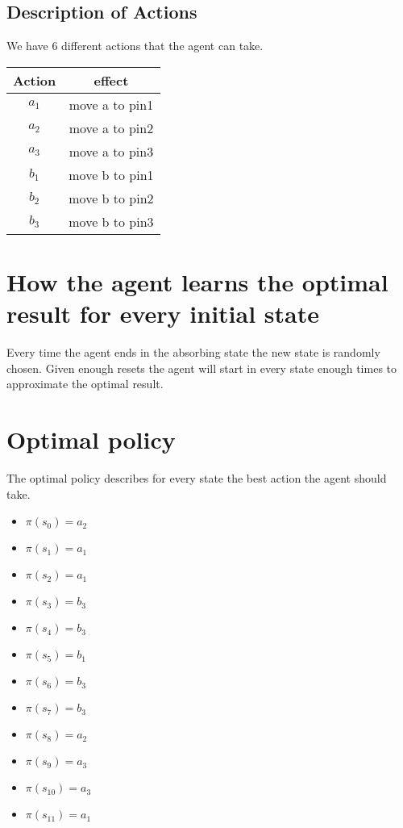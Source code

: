\documentclass[a4paper]{article}
\begin{document}
\newpage
\subsection{Description of Actions}
We have 6 different actions that the agent can take. \\

\begin{tabular}{c|c}
Action & effect \\
\hline
$a_{1}$ & move a to pin1 \\
$a_{2}$ & move a to pin2 \\
$a_{3}$ & move a to pin3 \\
$b_{1}$ & move b to pin1 \\
$b_{2}$ & move b to pin2 \\
$b_{3}$ & move b to pin3
\end{tabular}

\section{How the agent learns the optimal result for every initial state}
Every time the agent ends in the absorbing state the new state is randomly chosen. Given enough resets the agent will start in every state enough times to approximate the optimal result.

\section{Optimal policy}
The optimal policy describes for every state the best action the agent should take.

\begin{multicols}{2}
\begin{itemize}
\item $\pi(s_{0}) = a_{2}$
\item $\pi(s_{1}) = a_{1}$
\item $\pi(s_{2}) = a_{1}$
\item $\pi(s_{3}) = b_{3}$
\item $\pi(s_{4}) = b_{3}$
\item $\pi(s_{5}) = b_{1}$
\item $\pi(s_{6}) = b_{3}$
\item $\pi(s_{7}) = b_{3}$
\item $\pi(s_{8}) = a_{2}$
\item $\pi(s_{9}) = a_{3}$
\item $\pi(s_{10}) = a_{3}$
\item $\pi(s_{11}) = a_{1}$
\end{itemize}
\end{multicols}
\end{document}
